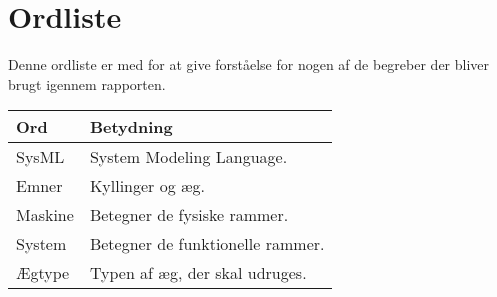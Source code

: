\section{Ordliste}

Denne ordliste er med for at give forståelse for nogen af de begreber der bliver brugt igennem rapporten. 

\begin{tabular}{|l|l|}
\hline  \textbf{Ord} & \textbf{Betydning}  \\ 
\hline SysML & System Modeling Language. \\
\hline Emner & Kyllinger og æg. \\ 
\hline Maskine & Betegner de fysiske rammer. \\
\hline System & Betegner de funktionelle rammer.  \\ 
\hline Ægtype & Typen af æg, der skal udruges. \\
\hline 
\end{tabular} 